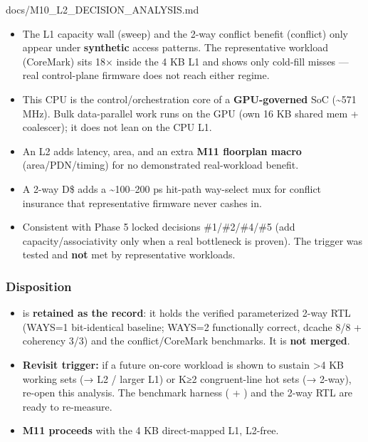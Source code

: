 \begin{relocated}{docs/M10_L2_DECISION_ANALYSIS.md}
\begin{itemize}
\tightlist
\item
  The L1 capacity wall (sweep) and the 2-way conflict benefit (conflict)
  only appear under \textbf{synthetic} access patterns. The
  representative workload (CoreMark) sits 18× inside the 4 KB L1 and
  shows only cold-fill misses --- real control-plane firmware does not
  reach either regime.
\item
  This CPU is the control/\allowbreak{}orchestration core of a
  \textbf{GPU-governed} SoC (\textasciitilde571 MHz). Bulk data-parallel
  work runs on the GPU (own 16 KB shared mem + coalescer); it does not
  lean on the CPU L1.
\item
  An L2 adds latency, area, and an extra \textbf{M11 floorplan macro}
  (area/\allowbreak{}PDN/\allowbreak{}timing) for no demonstrated
  real-workload benefit.
\item
  A 2-way D\$ adds a \textasciitilde100--200 ps hit-path way-select mux
  for conflict insurance that representative firmware never cashes in.
\item
  Consistent with Phase 5 locked decisions
  \#1/\allowbreak{}\#2/\allowbreak{}\#4/\allowbreak{}\#5 (add
  capacity/\allowbreak{}associativity only when a real bottleneck is
  proven). The trigger was tested and \textbf{not} met by representative
  workloads.
\end{itemize}

\subsubsection{Disposition}\label{tm:dec:m10-l2:disposition}

\begin{itemize}
\tightlist
\item
   is \textbf{retained as the record}: it
  holds the verified parameterized 2-way RTL (WAYS=1 bit-identical
  baseline; WAYS=2 functionally correct, dcache 8/8 + coherency 3/3) and
  the conflict/\allowbreak{}CoreMark benchmarks. It is \textbf{not
  merged}.
\item
  \textbf{Revisit trigger:} if a future on-core workload is shown to
  sustain \textgreater4 KB working sets (→ L2 / larger L1) or K≥2
  congruent-line hot sets (→ 2-way), re-open this analysis. The
  benchmark harness ( + ) and the
  2-way RTL are ready to re-measure.
\item
  \textbf{M11 proceeds} with the 4 KB direct-mapped L1, L2-free.
\end{itemize}
\end{relocated}


